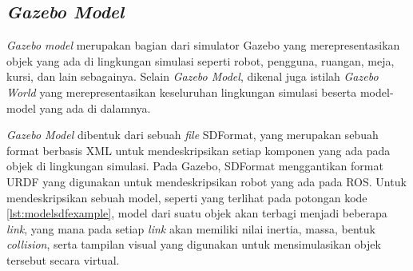 \subsection{\emph{Gazebo Model}}
\label{subsec:gazebomodel}

\emph{Gazebo model} merupakan bagian dari simulator Gazebo yang merepresentasikan objek yang ada di lingkungan simulasi seperti robot, pengguna, ruangan, meja, kursi, dan lain sebagainya.
Selain \emph{Gazebo Model}, dikenal juga istilah \emph{Gazebo World} yang merepresentasikan keseluruhan lingkungan simulasi beserta model-model yang ada di dalamnya.



\emph{Gazebo Model} dibentuk dari sebuah \emph{file} SDFormat,
  yang merupakan sebuah format berbasis XML untuk mendeskripsikan setiap komponen yang ada pada objek di lingkungan simulasi.
Pada Gazebo, SDFormat menggantikan format URDF yang digunakan untuk mendeskripsikan robot yang ada pada ROS.
Untuk mendeskripsikan sebuah model,
  seperti yang terlihat pada potongan kode \ref{lst:modelsdfexample},
  model dari suatu objek akan terbagi menjadi beberapa \emph{link},
  yang mana pada setiap \emph{link} akan memiliki nilai inertia, massa, bentuk \emph{collision}, serta tampilan visual yang digunakan untuk mensimulasikan objek tersebut secara virtual.
